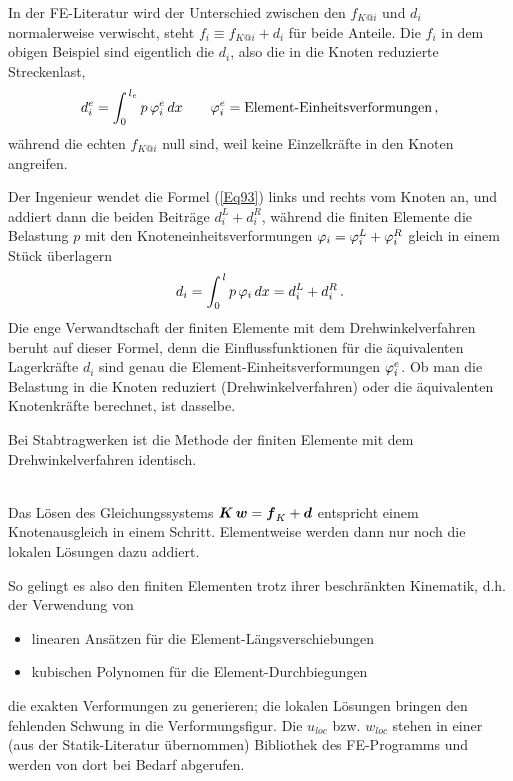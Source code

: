 In der FE-Literatur wird der Unterschied zwischen den $f_{K @i}$ und $d_i$ normalerweise verwischt, steht $f_i \equiv f_{K @i} + d_i$  f\"{u}r beide Anteile. Die $f_i$ in dem obigen Beispiel sind eigentlich die $d_i$, also die in die Knoten reduzierte Streckenlast,
\begin{align}\label{Eq93}
d_i^e = \int_0^{\,l_e} p\,\varphi_i^e\,dx \qquad \varphi_i^e = \text{Element-Einheitsverformungen}\,,
\end{align}
w\"{a}hrend die echten $f_{K @i}$ null sind, weil keine Einzelkr\"{a}fte in den Knoten angreifen.

Der Ingenieur wendet die Formel (\ref{Eq93}) links und rechts vom Knoten an, und addiert dann die beiden Beitr\"{a}ge $d_i^{L} + d_i^{R}$, w\"{a}hrend die finiten Elemente die Belastung $p$ mit den Knoteneinheitsverformungen $\varphi_i = \varphi_i^{L} + \varphi_i^{R}$ gleich \glq in einem St\"{u}ck\grq{} \"{u}berlagern
\begin{align}
d_i = \int_0^{\,l} p\,\varphi_i\,dx = d_i^{L} + d_i^{R}\,.
\end{align}
Die enge Verwandtschaft der finiten Elemente mit dem Drehwinkelverfahren beruht auf dieser Formel, denn die Einflussfunktionen f\"{u}r die \"{a}quivalenten Lagerkr\"{a}fte $d_i$ sind genau die Element-Einheits\-verformungen $\varphi_i^e$. Ob man die Belastung in die Knoten reduziert (Drehwinkelverfahren) oder die \"{a}quivalenten Knotenkr\"{a}fte berechnet, ist dasselbe.\\

\hspace*{-12pt}\colorbox{highlightBlue}{\parbox{0.98\textwidth}{Bei Stabtragwerken ist die Methode der finiten Elemente mit dem Drehwinkelverfahren identisch. }}\\

Das L\"{o}sen des Gleichungssystems $\mbox{\boldmath $K$}\,\mbox{\boldmath $w$} = \mbox{\boldmath $f$}_K + \mbox{\boldmath $d$}$ entspricht einem Knotenausgleich in einem Schritt. Elementweise werden dann nur noch die lokalen L\"{o}sungen dazu addiert.

So gelingt es also den finiten Elementen trotz ihrer beschr\"{a}nkten Kinematik, d.h. der Verwendung von
\begin{itemize}
  \item linearen Ans\"{a}tzen f\"{u}r die Element-L\"{a}ngsverschiebungen
  \item kubischen Polynomen f\"{u}r die Element-Durchbiegungen
\end{itemize}
die exakten Verformungen zu generieren; die lokalen L\"{o}sungen bringen den fehlenden \glq Schwung\grq{} in die Verformungsfigur. Die $u_{loc}$ bzw. $w_{loc}$ stehen in einer (aus der Statik-Literatur \"{u}bernommen) Bibliothek des FE-Programms und werden von dort bei Bedarf abgerufen.

